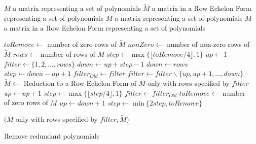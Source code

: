 \begin{algorithm}[!ht]
  \begin{algorithmic}[1]
    \Require
      \Statex $M$ a matrix representing a set of polynomials
      \Statex $\tilde{M}$ a matrix in a Row Echelon Form representing a set of polynomials
    \Ensure
      \Statex $M$ a matrix representing a set of polynomials
      \Statex $\tilde{M}$ a matrix in a Row Echelon Form representing a set of polynomials
      \Statex

      \State $toRemove \gets $ number of zero rows of $\tilde{M}$
      \State $nonZero \gets$ number of non-zero rows of $\tilde{M}$
      \State $rows \gets$ number of rows of $M$
      \State $step \gets \max\{\lfloor toRemove/4\rfloor, 1\}$ 
      \State $up \gets 1$
      \State $filter \gets \{1,2,\dots,rows\}$
        \State $down \gets up + step - 1$
          \State $down \gets rows$
	  \State $step \gets down - up + 1$
	\EndIf
	\State $filter_{Old} \gets filter$
	\State $filter \gets filter \backslash \{up, up+1, \dots, down\}$
	\State $\tilde{M} \gets$ Reduction to a Row Echelon Form of $M$ only with rows specified by $filter$
	    \State $up \gets up + 1$
	  \Else
            \State $step \gets \max\{\lfloor step/4\rfloor, 1\}$
	  \EndIf
	  \State $filter \gets filter_{Old}$
	\Else
	  \State $toRemove \gets$ number of zero rows of $\tilde{M}$
          \State $up \gets down + 1$
	  \State $step \gets \min\{2 step, toRemove\}$
	\EndIf
      \EndWhile

      \State \Return $(M$ only with rows specified by $filter, \tilde{M})$
  \end{algorithmic}
  \caption{Remove redundant polynomials}
  \label{alg:removeRedundant}
\end{algorithm}

